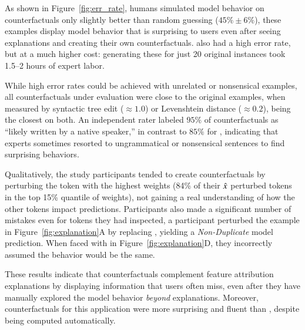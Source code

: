 As shown in Figure~\ref{fig:err_rate}, humans simulated model behavior on \cshap counterfactuals only slightly better than random guessing ($45\%\pm6\%$), \ie these examples display model behavior that is surprising to users even after seeing explanations and creating their own counterfactuals. \chuman also had a high error rate, but at a much higher cost: generating these for just 20 original instances took 1.5--2 hours of expert labor.

While high error rates could be achieved with unrelated or nonsensical examples, all counterfactuals under evaluation were close to the original examples, when measured by syntactic tree edit (${\approx}1.0$) or Levenshtein distance (${\approx}0.2$), \cshap being the closest on both. An independent rater labeled $95\%$ of \cshap counterfactuals as ``likely written by a native speaker,'' in contrast to $85\%$ for \chuman, indicating that experts sometimes resorted to ungrammatical or nonsensical sentences to find surprising behaviors.

Qualitatively, the study participants tended to create counterfactuals by perturbing the token with the highest weights (84\% of their $\hat{x}$ perturbed tokens in the top 15\% quantile of weights), not gaining a real understanding of how the other tokens impact predictions. Participants also made a significant number of mistakes even for tokens they had inspected, \eg a participant perturbed the example in Figure~\ref{fig:explanation}A by replacing , yielding a \emph{Non-Duplicate} model prediction. When faced with  in Figure~\ref{fig:explanation}D, they incorrectly assumed the behavior would be the same.

These results indicate that \sysname{} counterfactuals complement feature attribution explanations by displaying information that users often miss, even after they have manually explored the model behavior \emph{beyond} explanations. Moreover, \sysname{} counterfactuals for this application were more surprising and fluent than \chuman, despite being computed automatically.


